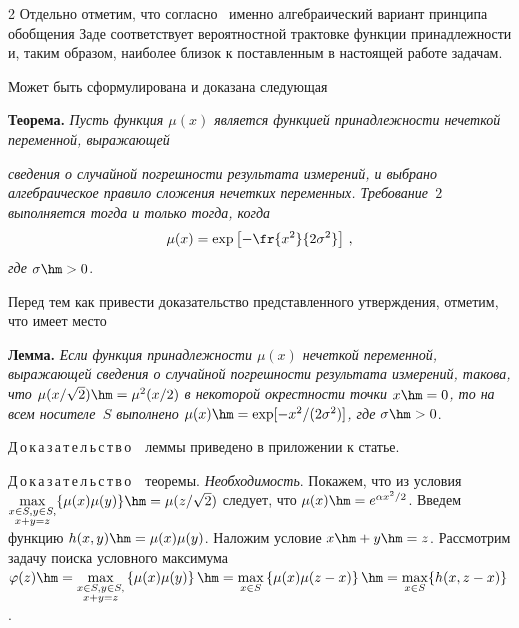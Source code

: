 \begin{multicols}{2}
  Отдельно отметим, что согласно~\cite{11sem} именно алгебраический 
вариант принципа обобщения Заде соответствует вероятностной трактовке 
функции принадлежности и, таким образом, наиболее близок к поставленным в 
настоящей работе задачам.

  
  Может быть сформулирована и доказана следующая
  
  \smallskip
  
  \noindent
  \textbf{Теорема.} \textit{Пусть функция $\mu(x)$ является функцией 
принадлежности нечеткой переменной, выражающей}\linebreak\vspace*{-12pt}

\pagebreak

\noindent
 \textit{сведения о случайной 
погрешности результата измерений, и выбрано алгебраическое правило 
сложения нечетких переменных. Требование~$2$ выполняется тогда и только 
тогда, когда} $$
\mu(x)=\exp\left[ -\fr{x^2}{2\sigma^2}\right]\,,
$$
\textit{где} 
$\sigma\hm>0$.
  
  \medskip
  
  Перед тем как привести доказательство пред\-став\-лен\-но\-го утверждения, 
отметим, что имеет место
  
  \medskip
  
  \noindent
  \textbf{Лемма.} \textit{Если функция принадлежности $\mu(x)$ нечеткой 
переменной, выражающей сведения о случайной погрешности результата 
измерений, такова, что $\mu(x/\sqrt{2}) \hm = \mu^2(x/2)$ в некоторой 
окрестности точки $x\hm=0$, то на всем носителе~$S$ выполнено 
$\mu(x)\hm=\exp [-x^2/(2\sigma^2)]$, где} $\sigma\hm>0$.
  
  \medskip
  
  \noindent
  Д\,о\,к\,а\,з\,а\,т\,е\,л\,ь\,с\,т\,в\,о\ \ леммы приведено в приложении к статье.
  
  \smallskip
  
  \noindent
  Д\,о\,к\,а\,з\,а\,т\,е\,л\,ь\,с\,т\,в\,о\ \ теоремы. \textit{Необходимость}. 
Покажем, что из условия $\max\limits_{\substack{{x\in S, y\in 
S,}\\{x+y=z}}}\{\mu(x)\mu(y)\}\hm= \mu(z/\sqrt{2})$ следует, что $\mu(x)\hm= 
e^{\alpha x^2/2}$. Введем функцию $h(x,y)\hm=\mu(x)\mu(y)$. Наложим 
условие $x\hm+y\hm=z$. Рассмотрим задачу поиска условного максимума 
$\varphi(z)\hm= \max\limits_{\substack{{x\in S, y\in S,}\\{x+y=z}}}\left\{\mu(x)\mu(y)\right\} \hm= 
\max\limits_{x\in S} \left \{ \mu(x)\mu(z-x)\right\}\hm=
\max\limits_{x\in S} \{h(x,z-x)\}$.
  

\end{multicols}
